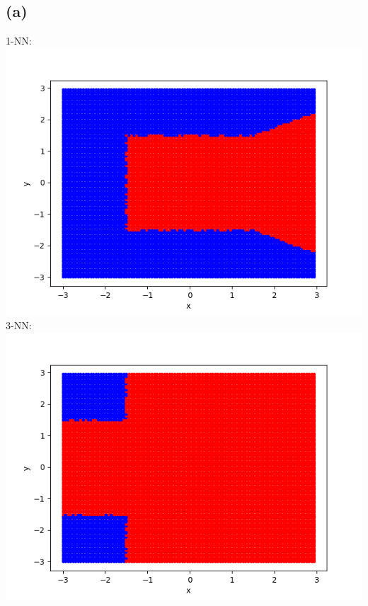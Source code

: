 \documentclass{article}
\begin{document}
	\subsection*{(a)}
		1-NN:\\
		\includegraphics[scale=0.8]{p6.1a1}\\
		3-NN:\\
		\includegraphics[scale=0.8]{p6.1a3}
\end{document}
